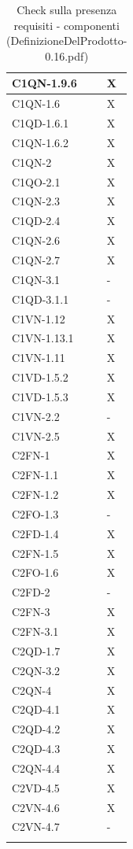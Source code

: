 \begin{footnotesize}
\begin{longtable}{|p{}|p{}|}
 C1QN-1.9.6 &X  \\ \hline
 C1QN-1.6 &X \\ \hline
 C1QD-1.6.1&X \\ \hline
 C1QN-1.6.2&X   \\ \hline
 C1QN-2&X \\ \hline
 C1QO-2.1&X \\ \hline
 C1QN-2.3&X  \\ \hline
 C1QD-2.4&X  \\ \hline
 C1QN-2.6&X  \\ \hline
 C1QN-2.7&X    \\ \hline
 C1QN-3.1&-   \\ \hline
 C1QD-3.1.1&-    \\ \hline
 C1VN-1.12&X \\ \hline
 C1VN-1.13.1&X  \\ \hline
 C1VN-1.11&X  \\ \hline
 C1VD-1.5.2&X \\ \hline
 C1VD-1.5.3&X   \\ \hline
 C1VN-2.2&- \\ \hline
 C1VN-2.5&X  \\ \hline
 C2FN-1&X    \\ \hline
 C2FN-1.1&X    \\ \hline
 C2FN-1.2&X   \\ \hline
 C2FO-1.3&-    \\ \hline
 C2FD-1.4&X   \\ \hline
 C2FN-1.5&X   \\ \hline
 C2FO-1.6&X   \\ \hline
 C2FD-2&-    \\ \hline
 C2FN-3&X   \\ \hline
 C2FN-3.1&X   \\ \hline
 C2QD-1.7&X   \\ \hline
 C2QN-3.2&X   \\ \hline
 C2QN-4 &X  \\ \hline
 C2QD-4.1&X    \\ \hline
 C2QD-4.2&X   \\ \hline
 C2QD-4.3&X   \\ \hline
 C2QN-4.4&X  \\ \hline
 C2VD-4.5&X   \\ \hline
 C2VN-4.6&X    \\ \hline
 C2VN-4.7&-  \\ \hline

\caption{Check sulla presenza requisiti - componenti
(DefinizioneDelProdotto-0.16.pdf)}
\end{longtable}
\end{footnotesize}

